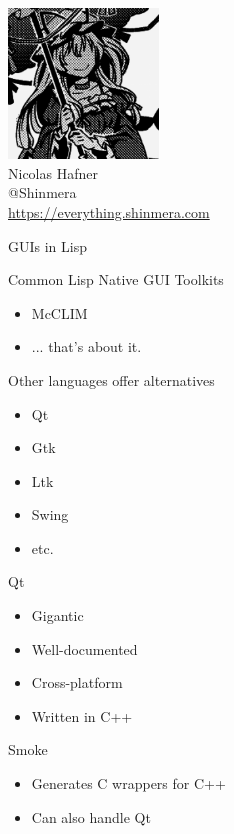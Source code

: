 \documentclass[14pt]{beamer}
\newcommand{\toptitle}[1]{
  {\huge #1} \\
  \vspace{0.2cm}
}
\renewcommand{\subtitle}[1]{
  {\large #1} \\
  \vspace{0.2cm}
}
\begin{document}
\begin{frame}
  \begin{center}
    \includegraphics[height=4cm]{avatar.png}\\
    \vspace{0.2cm}
    {\Large Nicolas Hafner} \\
    \vspace{0.2cm}
    {\Huge @Shinmera} \\
    \vspace{0.2cm}
    \url{https://everything.shinmera.com}
  \end{center}
\end{frame}

\begin{frame}
  \toptitle{GUIs in Lisp}
  Common Lisp Native GUI Toolkits
  \begin{itemize}
  \item McCLIM
    \pause
  \item ... that's about it.
  \end{itemize}
  \vspace{0.5cm}

  \pause
  Other languages offer alternatives
  \begin{itemize}
  \item Qt
  \item Gtk
  \item Ltk
  \item Swing
  \item etc.
  \end{itemize}
\end{frame}

\begin{frame}
  \toptitle{Qt}
  \begin{itemize}
  \item Gigantic
  \item Well-documented
  \item Cross-platform
    \pause
  \item Written in C++
  \end{itemize}
  \vspace{0.5cm}

  \pause
  \subtitle{Smoke}
  \begin{itemize}
  \item Generates C wrappers for C++
  \item Can also handle Qt
  \end{itemize}
\end{frame}
\end{document}
